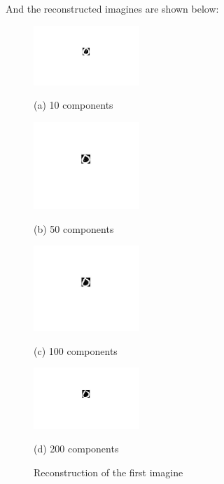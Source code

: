 \documentclass[letterpaper,12pt]{article}
\begin{document}
And the reconstructed imagines are shown below:
\begin{center}
\begin{figure}[h]

\begin{minipage}{0.48\linewidth}
  \centerline{\includegraphics[width=4.0cm]{pca1_10.jpg}}
  \centerline{(a) 10 components}
\end{minipage}
\hfill
\begin{minipage}{.48\linewidth}
  \centerline{\includegraphics[width=4.0cm]{pca1_50.jpg}}
  \centerline{(b) 50 components}
\end{minipage}
\vfill
\begin{minipage}{0.48\linewidth}
  \centerline{\includegraphics[width=4.0cm]{pca1_100.jpg}}
  \centerline{(c) 100 components}
\end{minipage}
\hfill
\begin{minipage}{0.48\linewidth}
  \centerline{\includegraphics[width=4.0cm]{pca1_200.jpg}}
  \centerline{(d) 200 components}
\end{minipage}
\caption{Reconstruction of the first imagine}
\label{fig:res}

\end{figure}
\end{center}
\end{document}
